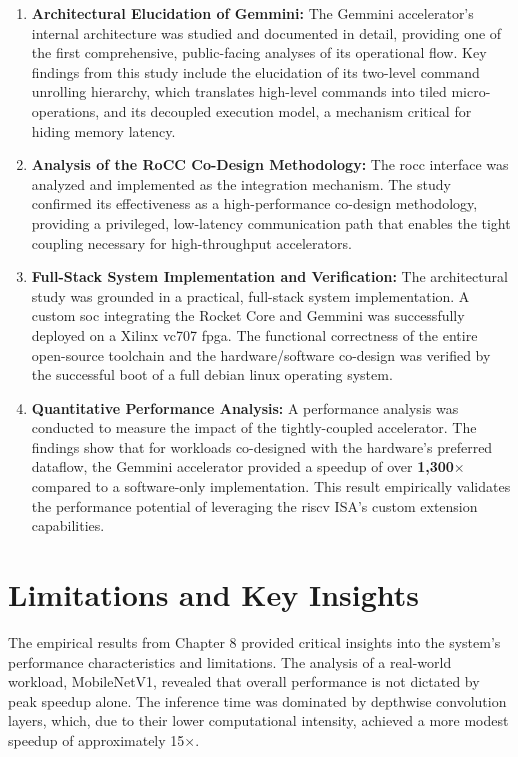 \begin{enumerate}
    \item \textbf{Architectural Elucidation of Gemmini:} The Gemmini accelerator's internal architecture was studied and documented in detail, providing one of the first comprehensive, public-facing analyses of its operational flow. Key findings from this study include the elucidation of its two-level command unrolling hierarchy, which translates high-level commands into tiled micro-operations, and its decoupled execution model, a mechanism critical for hiding memory latency.

    \item \textbf{Analysis of the RoCC Co-Design Methodology:} The \acrshort{rocc} interface was analyzed and implemented as the integration mechanism. The study confirmed its effectiveness as a high-performance co-design methodology, providing a privileged, low-latency communication path that enables the tight coupling necessary for high-throughput accelerators.

    \item \textbf{Full-Stack System Implementation and Verification:} The architectural study was grounded in a practical, full-stack system implementation. A custom \acrshort{soc} integrating the Rocket Core and Gemmini was successfully deployed on a Xilinx \acrshort{vc707} \acrshort{fpga}. The functional correctness of the entire open-source toolchain and the hardware/software co-design was verified by the successful boot of a full \acrshort{debian} \acrshort{linux} operating system.

    \item \textbf{Quantitative Performance Analysis:} A performance analysis was conducted to measure the impact of the tightly-coupled accelerator. The findings show that for workloads co-designed with the hardware's preferred dataflow, the Gemmini accelerator provided a speedup of over \textbf{1,300$\times$} compared to a software-only implementation. This result empirically validates the performance potential of leveraging the \acrshort{riscv} ISA's custom extension capabilities.
\end{enumerate}

\section{Limitations and Key Insights}
The empirical results from Chapter 8 provided critical insights into the system's performance characteristics and limitations. The analysis of a real-world workload, MobileNetV1, revealed that overall performance is not dictated by peak speedup alone. The inference time was dominated by depthwise convolution layers, which, due to their lower computational intensity, achieved a more modest speedup of approximately 15$\times$.

